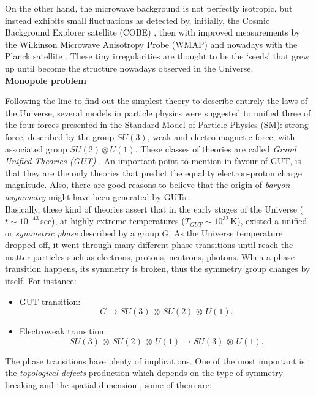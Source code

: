 \documentclass{rmaa}
\begin{document}
On the other hand, the microwave background is not perfectly isotropic, but instead exhibits
small fluctuations as detected by, initially, the Cosmic Background Explorer satellite (COBE) \citep{Smooth}, 
 then with improved measurements by the Wilkinson Microwave Anisotropy Probe (WMAP)
\citep{wmap5, Larson} and nowadays with the Planck satellite \citep{Planck}. 
These tiny irregularities are thought to be the `seeds' that grew 
up until become the structure nowadays observed in the Universe. 
\\


\vskip 16pt
\textbf{Monopole problem} 
\vskip 10pt

Following the line to find out the simplest theory to describe entirely the laws of the Universe,
several models in particle physics were suggested to unified three of the 
four forces presented in the Standard Model of Particle Physics (SM): strong force, described
by the group $SU(3)$, weak and electro-magnetic force, with associated group $SU(2)\otimes U(1)$. 
These classes of theories are called \textit{Grand Unified Theories (GUT)} \citep{Georgi}.
 An important point to mention in favour of GUT,  is that they are the only theories that 
 predict the equality electron-proton charge magnitude. Also, there are good reasons to 
 believe that the origin of \textit{baryon asymmetry} might have been generated by GUTs \citep{Kolb83}.
\\

Basically, these kind of theories assert that in the early stages of the Universe ($t \sim 10^{-43}\, $sec), 
at highly extreme temperatures ($T_{GUT}\sim 10^{32} \, $K), existed a unified or 
\textit{symmetric phase} described by a group $G$. As the Universe
temperature dropped off, it went through many different phase transitions until reach 
the matter particles such as electrons, protons, neutrons, photons.
%
When a phase transition happens, its symmetry is broken, thus the symmetry group changes by itself.
For instance: 
 \begin{itemize}
 \item GUT transition: $$G \to SU(3)\,\otimes\, SU(2)\, \otimes \, U(1).$$
 \item Electroweak transition: $$SU(3)\,\otimes\, SU(2)\, \otimes \, U(1) \to SU(3)\, \otimes \, U(1).$$ 
\end{itemize}

\noindent
The phase transitions have plenty of implications. One of the most important is the
\textit{topological defects} production which depends on the type of symmetry breaking 
and the spatial dimension \citep{Vilenkin}, some of them are:   
\end{document}
